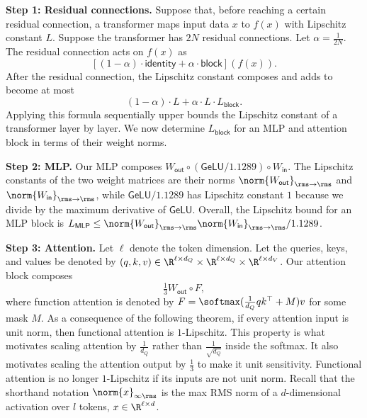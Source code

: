 \textbf{Step 1: Residual connections.} Suppose that, before reaching a certain residual connection, a transformer maps input data $x$ to $f(x)$ with Lipschitz constant $L$. Suppose the transformer has $2N$ residual connections. Let $\alpha = \tfrac{1}{2N}$. The residual connection acts on $f(x)$ as \begin{equation}
    \left[ (1 - \alpha) \cdot \mathsf{identity} + \alpha \cdot \mathsf{block} \right](f(x)).
\end{equation} After the residual connection, the Lipschitz constant composes and adds to become at most \begin{equation}
    (1 - \alpha) \cdot L + \alpha \cdot L \cdot L_\mathsf{block}.
\end{equation} Applying this formula sequentially upper bounds the Lipschitz constant of a transformer layer by layer. We now determine $L_\mathsf{block}$ for an MLP and attention block in terms of their weight norms.

\textbf{Step 2: MLP.} Our MLP composes $W_\mathsf{out} \circ (\mathsf{GeLU} / 1.1289) \circ W_\mathsf{in}$. The Lipschitz constants of the two weight matrices are their norms $\norm{W_\mathsf{out}}_{\rms\to\rms}$ and $\norm{W_\mathsf{in}}_{\rms\to\rms}$, while $\mathsf{GeLU} / 1.1289$ has Lipschitz constant $1$ because we divide by the maximum derivative of $\mathsf{GeLU}$. Overall, the Lipschitz bound for an MLP block is $L_\mathsf{MLP} \leq \norm{W_\mathsf{out}}_{\rms\to\rms} \norm{W_\mathsf{in}}_{\rms\to\rms} / 1.1289$.

\textbf{Step 3: Attention.} Let $\ell$ denote the token dimension. Let the queries, keys, and values be denoted by $(q, k, v) \in \R^{\ell \times d_Q} \times \R^{\ell \times d_Q} \times \R^{\ell \times d_V}$. Our attention block composes \begin{equation}
    \tfrac13 W_\mathsf{out} \circ F,
\end{equation} where function attention is denoted by $F = \softmax(\tfrac{1}{d_Q} qk^\top + M)v$ for some mask $M$. As a consequence of the following theorem, if every attention input is unit norm, then functional attention is $1$-Lipschitz. This property is what motivates scaling attention by $\tfrac{1}{d_Q}$ rather than $\tfrac{1}{\sqrt{d_Q}}$ inside the softmax. It also motivates scaling the attention output by $\tfrac{1}{3}$ to make it unit sensitivity. Functional attention is no longer $1$-Lipschitz if its inputs are not unit norm. Recall that the shorthand notation $\norm{x}_{\infty\rms}$ is the max RMS norm of a $d$-dimensional activation over $l$ tokens, $x \in \R^{\ell \times d}$.

